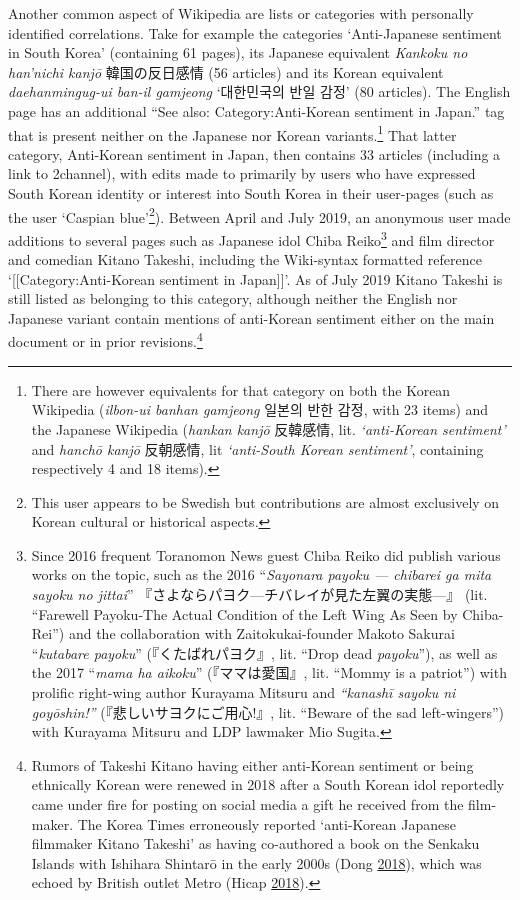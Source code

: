 \documentclass[10pt,british,A4paper,twoside]{memoir}
\begin{document}
Another common aspect of Wikipedia are lists or categories with
personally identified correlations. Take for example the categories
`Anti-Japanese sentiment in South Korea' (containing 61 pages), its
Japanese equivalent \emph{Kankoku no han'nichi kanjō} 韓国の反日感情 (56
articles) and its Korean equivalent \emph{daehanmingug-ui ban-il
gamjeong} `대한민국의 반일 감정' (80 articles). The English page has an
additional ``See also: Category:Anti-Korean sentiment in Japan.'' tag
that is present neither on the Japanese nor Korean variants.\footnote{There
  are however equivalents for that category on both the Korean Wikipedia
  (\emph{ilbon-ui banhan gamjeong} 일본의 반한 감정, with 23 items) and
  the Japanese Wikipedia (\emph{hankan kanjō} 反韓感情, lit.
  \emph{`anti-Korean sentiment'} and \emph{hanchō kanjō} 反朝感情, lit
  \emph{`anti-South Korean sentiment'}, containing respectively 4 and 18
  items).} That latter category, Anti-Korean sentiment in Japan, then
contains 33 articles (including a link to 2channel), with edits made to
primarily by users who have expressed South Korean identity or interest
into South Korea in their user-pages (such as the user `Caspian
blue'\footnote{This user appears to be Swedish but contributions are
  almost exclusively on Korean cultural or historical aspects.}).
Between April and July 2019‎, an anonymous user made additions to
several pages such as Japanese idol Chiba Reiko\footnote{Since 2016
  frequent Toranomon News guest Chiba Reiko did publish various works on
  the topic, such as the 2016 ``\emph{Sayonara payoku — chibarei ga mita
  sayoku no jittai}'' 『さよならパヨク---チバレイが見た左翼の実態---』
  (lit. ``Farewell Payoku-The Actual Condition of the Left Wing As Seen
  by Chiba-Rei'') and the collaboration with Zaitokukai-founder Makoto
  Sakurai ``\emph{kutabare payoku}'' (『くたばれパヨク』, lit. ``Drop
  dead \emph{payoku}''), as well as the 2017 ``\emph{mama ha aikoku}''
  (『ママは愛国』, lit. ``Mommy is a patriot'') with prolific right-wing
  author Kurayama Mitsuru and \emph{``kanashī sayoku ni goyōshin!''}
  (『悲しいサヨクにご用心!』, lit. ``Beware of the sad left-wingers'')
  with Kurayama Mitsuru and LDP lawmaker Mio Sugita.} and film director
and comedian Kitano Takeshi, including the Wiki-syntax formatted
reference `{[}{[}Category:Anti-Korean sentiment in Japan{]}{]}'. As of
July 2019 Kitano Takeshi is still listed as belonging to this category,
although neither the English nor Japanese variant contain mentions of
anti-Korean sentiment either on the main document or in prior
revisions.\footnote{Rumors of Takeshi Kitano having either anti-Korean
  sentiment or being ethnically Korean were renewed in
  2018 after a South Korean idol reportedly came under fire for posting
  on social media a gift he received from the film-maker. The Korea
  Times erroneously reported `anti-Korean Japanese filmmaker Kitano
  Takeshi' as having co-authored a book on the Senkaku Islands with
  Ishihara Shintarō in the early 2000s (Dong
  \protect\hyperlink{ref-dong_ikon_2018}{2018}), which was echoed by
  British outlet Metro (Hicap
  \protect\hyperlink{ref-hicap_ikons_2018}{2018}).}
\end{document}
